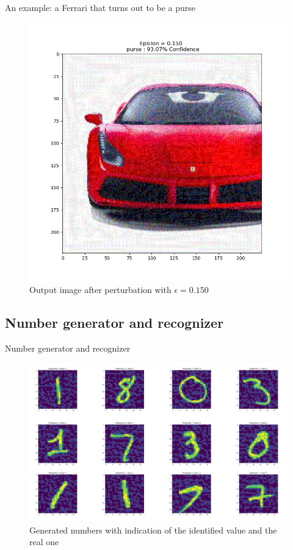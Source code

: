 \documentclass[8pt]{beamer}
\begin{document}
\begin{frame}{An example: a Ferrari that turns out to be a purse}
\begin{figure} 
    \includegraphics[scale=0.3]{images/output_3.png}
    \vspace*{-5mm}
    \caption{Output image after perturbation with $\epsilon=0.150$}
\end{figure}
\end{frame}

\subsection{Number generator and recognizer}
\begin{frame}{Number generator and recognizer}
\begin{figure} 
    \includegraphics[scale=0.5]{images/immagini_matrix/matrice_numeri.png}
    \vspace*{-3mm}
    \caption{Generated numbers with indication of the identified value and the real one}
\end{figure}
\end{frame}
\end{document}
